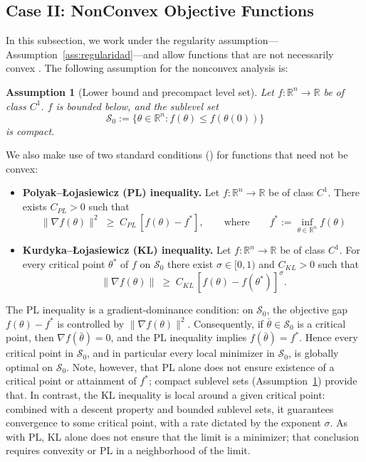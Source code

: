 \documentclass{article} %
\newtheorem{assumption}{Assumption}
\begin{document}
\subsection{Case II: NonConvex Objective Functions}
In this subsection, we work under the regularity assumption---Assumption~\ref{ass:regularidad}---and allow functions that are not necessarily convex \cite{Nesterov2004}. The following assumption for the nonconvex analysis is:
\begin{assumption}[Lower bound and precompact level set]\label{ass:nonconvexidad}
Let \(f:\mathbb{R}^n\to\mathbb{R}\) be of class \(C^1\). $f$ is bounded below, and the sublevel set 
    \[
    \mathcal{S}_0 := \{\theta \in \mathbb{R}^n : f(\theta) \leq f(\theta(0))\}
    \]
is compact.
\end{assumption}
We also make use of two standard conditions (\cite{PL,KL}) for functions that need not be convex:
\begin{itemize}
    \item \textbf{Polyak–Łojasiewicz (PL) inequality.} Let \(f:\mathbb{R}^n\to\mathbb{R}\) be of class \(C^1\). There exists $C_{PL}>0$ such that
    \[
    \|\nabla f(\theta)\|^2 \;\geq\; C_{PL}\,[f(\theta)-f^*],
    \qquad \text{where}\qquad f^* := \inf_{\theta\in\mathbb{R}^n} f(\theta)
    \]
    \item \textbf{Kurdyka–Łojasiewicz (KL) inequality.} Let \(f:\mathbb{R}^n\to\mathbb{R}\) be of class \(C^1\). For every critical point $\theta^*$ of $f$ on $\mathcal{S}_0$ there exist $\sigma\in[0,1)$ and $C_{KL}>0$ such that
    \[
    \|\nabla f(\theta)\| \;\geq\; C_{KL}\,[f(\theta)-f(\theta^*)]^\sigma.
    \]
\end{itemize}
The PL inequality is a gradient-dominance condition: on $\mathcal S_0$, the objective gap $f(\theta)-f^*$ is controlled by $\|\nabla f(\theta)\|^2$. Consequently, if $\bar\theta\in\mathcal S_0$ is a critical point, then $\nabla f(\bar\theta)=0$, and the PL inequality implies $f(\bar\theta)=f^*$. Hence every critical point in $\mathcal S_0$, and in particular every local minimizer in $\mathcal S_0$, is globally optimal on $\mathcal S_0$. Note, however, that PL alone does not ensure existence of a critical point or attainment of $f^*$; compact sublevel sets (Assumption~\ref{ass:nonconvexidad}) provide that. In contrast, the KL inequality is local around a given critical point: combined with a descent property and bounded sublevel sets, it guarantees convergence to some critical point, with a rate dictated by the exponent $\sigma$. As with PL, KL alone does not ensure that the limit is a minimizer; that conclusion requires convexity or PL in a neighborhood of the limit.
\end{document}
